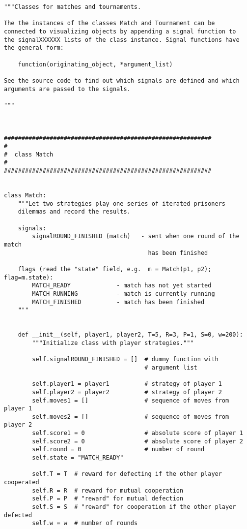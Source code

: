 \documentclass[12pt,a4paper,ngerman]{article}
\begin{document}
\begin{scriptsize}
\begin{verbatim}
"""Classes for matches and tournaments.

The the instances of the classes Match and Tournament can be
connected to visualizing objects by appending a signal function to
the signalXXXXXX lists of the class instance. Signal functions have
the general form:

    function(originating_object, *argument_list)

See the source code to find out which signals are defined and which
arguments are passed to the signals.

"""



###########################################################
#
#  class Match
#
###########################################################


class Match:
    """Let two strategies play one series of iterated prisoners
    dilemmas and record the results.

    signals:
        signalROUND_FINISHED (match)   - sent when one round of the match
                                         has been finished

    flags (read the "state" field, e.g.  m = Match(p1, p2); flag=m.state):
        MATCH_READY             - match has not yet started
        MATCH_RUNNING           - match is currently running
        MATCH_FINISHED          - match has been finished
    """


    def __init__(self, player1, player2, T=5, R=3, P=1, S=0, w=200):
        """Initialize class with player strategies."""

        self.signalROUND_FINISHED = []  # dummy function with
                                        # argument list

        self.player1 = player1          # strategy of player 1
        self.player2 = player2          # strategy of player 2
        self.moves1 = []                # sequence of moves from player 1
        self.moves2 = []                # sequence of moves from player 2   
        self.score1 = 0                 # absolute score of player 1
        self.score2 = 0                 # absolute score of player 2
        self.round = 0                  # number of round
        self.state = "MATCH_READY"

        self.T = T  # reward for defecting if the other player cooperated
        self.R = R  # reward for mutual cooperation
        self.P = P  # "reward" for mutual defection
        self.S = S  # "reward" for cooperation if the other player defected
        self.w = w  # number of rounds



\end{verbatim}
\end{scriptsize}
\end{document}

